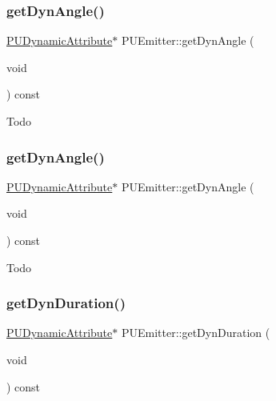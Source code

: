 \subsubsection{\texorpdfstring{get\+Dyn\+Angle()}{getDynAngle()}\hspace{0.1cm}{\footnotesize\ttfamily [1/2]}}
{\footnotesize\ttfamily \hyperlink{classPUDynamicAttribute}{P\+U\+Dynamic\+Attribute}$\ast$ P\+U\+Emitter\+::get\+Dyn\+Angle (\begin{DoxyParamCaption}\item[{void}]{ }\end{DoxyParamCaption}) const\hspace{0.3cm}{\ttfamily [inline]}}

Todo \mbox{\label{classPUEmitter_a9f87f8a7caeeaf022039e9226d5911b0}} 
\subsubsection{\texorpdfstring{get\+Dyn\+Angle()}{getDynAngle()}\hspace{0.1cm}{\footnotesize\ttfamily [2/2]}}
{\footnotesize\ttfamily \hyperlink{classPUDynamicAttribute}{P\+U\+Dynamic\+Attribute}$\ast$ P\+U\+Emitter\+::get\+Dyn\+Angle (\begin{DoxyParamCaption}\item[{void}]{ }\end{DoxyParamCaption}) const\hspace{0.3cm}{\ttfamily [inline]}}

Todo \mbox{\label{classPUEmitter_ab6ee381061b237e314ca9d7b756cd81b}} 
\subsubsection{\texorpdfstring{get\+Dyn\+Duration()}{getDynDuration()}\hspace{0.1cm}{\footnotesize\ttfamily [1/2]}}
{\footnotesize\ttfamily \hyperlink{classPUDynamicAttribute}{P\+U\+Dynamic\+Attribute}$\ast$ P\+U\+Emitter\+::get\+Dyn\+Duration (\begin{DoxyParamCaption}\item[{void}]{ }\end{DoxyParamCaption}) const\hspace{0.3cm}{\ttfamily [inline]}}

